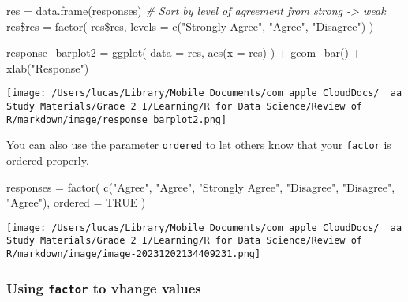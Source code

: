 \documentclass[
]{article}
\let\oldincludegraphics\includegraphics
\renewcommand{\includegraphics}[2][]{\begin{center}\oldincludegraphics[#1]{#2}\end{center}}
\newenvironment{Shaded}{}{}
\newcommand{\AttributeTok}[1]{\textcolor[rgb]{0.49,0.56,0.16}{#1}}
\newcommand{\CommentTok}[1]{\textcolor[rgb]{0.38,0.63,0.69}{\textit{#1}}}
\newcommand{\ConstantTok}[1]{\textcolor[rgb]{0.53,0.00,0.00}{#1}}
\newcommand{\FunctionTok}[1]{\textcolor[rgb]{0.02,0.16,0.49}{#1}}
\newcommand{\NormalTok}[1]{#1}
\newcommand{\OtherTok}[1]{\textcolor[rgb]{0.00,0.44,0.13}{#1}}
\newcommand{\SpecialCharTok}[1]{\textcolor[rgb]{0.25,0.44,0.63}{#1}}
\newcommand{\StringTok}[1]{\textcolor[rgb]{0.25,0.44,0.63}{#1}}
\begin{document}
\begin{Shaded}
\begin{Highlighting}[]
\NormalTok{res }\OtherTok{=}
  \FunctionTok{data.frame}\NormalTok{(responses)}
\CommentTok{\# Sort by level of agreement from strong {-}\textgreater{} weak}
\NormalTok{res}\SpecialCharTok{\$}\NormalTok{res }\OtherTok{=}
  \FunctionTok{factor}\NormalTok{(}
\NormalTok{    res}\SpecialCharTok{\$}\NormalTok{res,}
    \AttributeTok{levels =}
       \FunctionTok{c}\NormalTok{(}\StringTok{"Strongly Agree"}\NormalTok{, }\StringTok{"Agree"}\NormalTok{, }\StringTok{"Disagree"}\NormalTok{)}
\NormalTok{  )}

\NormalTok{response\_barplot2 }\OtherTok{=}
  \FunctionTok{ggplot}\NormalTok{(}
    \AttributeTok{data =}\NormalTok{ res,}
    \FunctionTok{aes}\NormalTok{(}\AttributeTok{x =}\NormalTok{ res)}
\NormalTok{  ) }\SpecialCharTok{+}
  \FunctionTok{geom\_bar}\NormalTok{() }\SpecialCharTok{+}
  \FunctionTok{xlab}\NormalTok{(}\StringTok{"Response"}\NormalTok{)}
\end{Highlighting}
\end{Shaded}

\texttt{[image: /Users/lucas/Library/Mobile Documents/com~apple~CloudDocs/~~aa Study Materials/Grade 2 I/Learning/R for Data Science/Review of R/markdown/image/response\_barplot2.png]}

You can also use the parameter \texttt{ordered} to let others know that
your \texttt{factor} is ordered properly.

\begin{Shaded}
\begin{Highlighting}[]
\NormalTok{responses }\OtherTok{=}
  \FunctionTok{factor}\NormalTok{(}
    \FunctionTok{c}\NormalTok{(}\StringTok{"Agree"}\NormalTok{, }\StringTok{"Agree"}\NormalTok{, }\StringTok{"Strongly Agree"}\NormalTok{, }\StringTok{"Disagree"}\NormalTok{, }\StringTok{"Disagree"}\NormalTok{, }\StringTok{"Agree"}\NormalTok{),}
    \AttributeTok{ordered =} \ConstantTok{TRUE}
\NormalTok{  )}
\end{Highlighting}
\end{Shaded}

\texttt{[image: /Users/lucas/Library/Mobile Documents/com~apple~CloudDocs/~~aa Study Materials/Grade 2 I/Learning/R for Data Science/Review of R/markdown/image/image-20231202134409231.png]}

\hypertarget{using-factor-to-vhange-values}{%
\subsubsection{\texorpdfstring{Using \texttt{factor} to vhange
values}{Using factor to vhange values}}\label{using-factor-to-vhange-values}}
\end{document}
